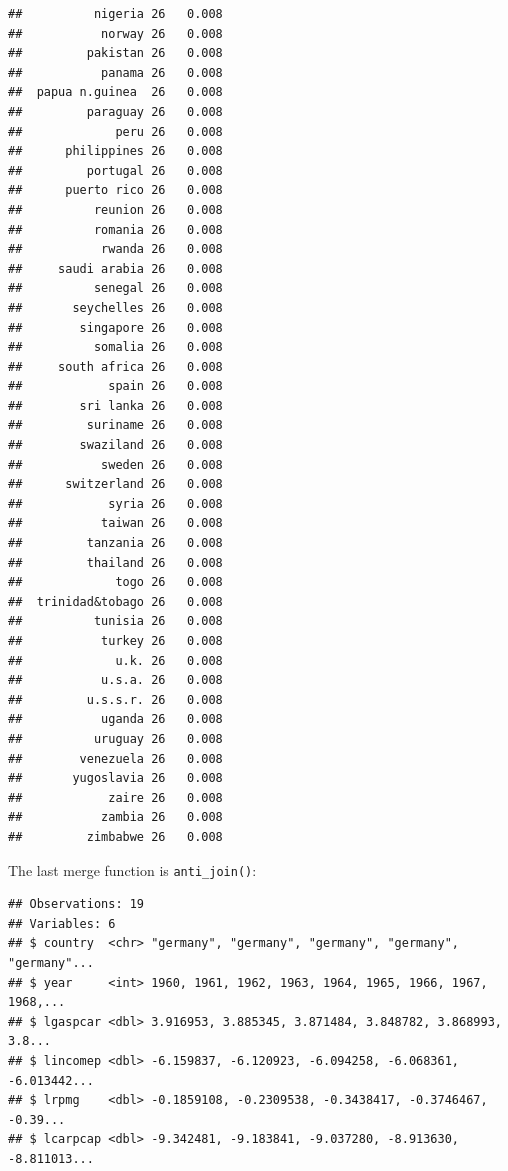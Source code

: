 \documentclass[]{gitbook}
\newenvironment{Shaded}{\begin{snugshade}}{\end{snugshade}}
\newcommand{\DataTypeTok}[1]{\textcolor[rgb]{0.13,0.29,0.53}{#1}}
\newcommand{\KeywordTok}[1]{\textcolor[rgb]{0.13,0.29,0.53}{\textbf{#1}}}
\newcommand{\NormalTok}[1]{#1}
\newcommand{\OperatorTok}[1]{\textcolor[rgb]{0.81,0.36,0.00}{\textbf{#1}}}
\newcommand{\StringTok}[1]{\textcolor[rgb]{0.31,0.60,0.02}{#1}}
\theoremstyle{definition}
\theoremstyle{definition}
\theoremstyle{definition}
\theoremstyle{remark}
\begin{document}
\begin{verbatim}
##          nigeria 26   0.008
##           norway 26   0.008
##         pakistan 26   0.008
##           panama 26   0.008
##  papua n.guinea  26   0.008
##         paraguay 26   0.008
##             peru 26   0.008
##      philippines 26   0.008
##         portugal 26   0.008
##      puerto rico 26   0.008
##          reunion 26   0.008
##          romania 26   0.008
##           rwanda 26   0.008
##     saudi arabia 26   0.008
##          senegal 26   0.008
##       seychelles 26   0.008
##        singapore 26   0.008
##          somalia 26   0.008
##     south africa 26   0.008
##            spain 26   0.008
##        sri lanka 26   0.008
##         suriname 26   0.008
##        swaziland 26   0.008
##           sweden 26   0.008
##      switzerland 26   0.008
##            syria 26   0.008
##           taiwan 26   0.008
##         tanzania 26   0.008
##         thailand 26   0.008
##             togo 26   0.008
##  trinidad&tobago 26   0.008
##          tunisia 26   0.008
##           turkey 26   0.008
##             u.k. 26   0.008
##           u.s.a. 26   0.008
##         u.s.s.r. 26   0.008
##           uganda 26   0.008
##          uruguay 26   0.008
##        venezuela 26   0.008
##       yugoslavia 26   0.008
##            zaire 26   0.008
##           zambia 26   0.008
##         zimbabwe 26   0.008
\end{verbatim}

The last merge function is \texttt{anti\_join()}:

\begin{Shaded}
\end{Shaded}

\begin{verbatim}
## Observations: 19
## Variables: 6
## $ country  <chr> "germany", "germany", "germany", "germany", "germany"...
## $ year     <int> 1960, 1961, 1962, 1963, 1964, 1965, 1966, 1967, 1968,...
## $ lgaspcar <dbl> 3.916953, 3.885345, 3.871484, 3.848782, 3.868993, 3.8...
## $ lincomep <dbl> -6.159837, -6.120923, -6.094258, -6.068361, -6.013442...
## $ lrpmg    <dbl> -0.1859108, -0.2309538, -0.3438417, -0.3746467, -0.39...
## $ lcarpcap <dbl> -9.342481, -9.183841, -9.037280, -8.913630, -8.811013...
\end{verbatim}
\end{document}
